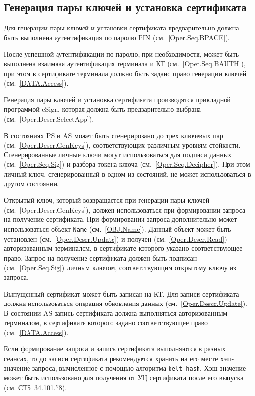 \subsection{Генерация пары ключей и установка сертификата}
\label{Oper.Seq.GeKeySetCert}

Для генерации пары ключей и 
установки сертификата предварительно 
должна быть выполнена аутентификация по 
паролю PIN (см.~\ref{Oper.Seq.BPACE}).

После успешной аутентификации по паролю,
при необходимости, может быть выполнена взаимная 
аутентификация терминала и КТ (см.~\ref{Oper.Seq.BAUTH}),
при этом в сертификате терминала должно быть задано
право генерации ключей (см.~\ref{DATA.Access}).

Генерация пары ключей и установка сертификата производятся
прикладной программой eSign, которая должна быть предварительно 
выбрана (см.~\ref{Oper.Descr.SelectApp}). 

В состояниях PS и AS может быть сгенерировано
до трех ключевых пар (см.~\ref{Oper.Descr.GenKeys}), 
соответствующих различным уровням стойкости. 
Сгенерированные личные ключи могут использоваться
для подписи данных (см.~\ref{Oper.Seq.Sig}) и разбора токена 
ключа (см.~\ref{Oper.Seq.Decipher}).
При этом личный ключ, сгенерированный в одном из состояний, 
не может использоваться в другом состоянии. 

Открытый ключ, который возвращается при генерации пары ключей
(см.~\ref{Oper.Descr.GenKeys}), должен использоваться при формировании 
запроса на получение сертификата.
При формировании запроса дополнительно может использоваться 
объект \texttt{Name} (см.~\ref{OBJ.Name}). 
Данный объект может быть установлен (см.~\ref{Oper.Descr.Update}) 
и получен (см.~\ref{Oper.Descr.Read})
авторизованным терминалом, в сертификате которого указано 
соответствующее право.
\fi
Запрос на получение сертификата должен быть подписан (см.~\ref{Oper.Seq.Sig})
личным ключом, соответствующим открытому ключу из запроса.

Выпущенный сертификат может быть записан на КТ.
Для записи сертификата должна использоваться операция 
обновления данных (см.~\ref{Oper.Descr.Update}). 
В состоянии AS запись сертификата должна выполняться 
авторизованным терминалом, в сертификате которого задано 
соответствующее право (см.~\ref{DATA.Access}). 

Если формирование запроса и запись сертификата выполняются в разных сеансах, 
то до записи сертификата рекомендуется хранить на его месте 
хэш-значение запроса, вычисленное с помощью алгоритма \texttt{belt-hash}. 
%
Хэш-значение может быть использовано для получения от УЦ
сертификата после его выпуска (см. СТБ~34.101.78).

